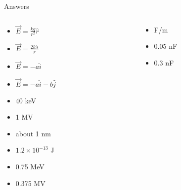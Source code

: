 \documentclass{beamer}
\begin{document}
\begin{frame}{Answers}
\small
\begin{columns}[T]
\begin{column}{0.5\textwidth}
\begin{itemize}
\item $\vec{E} = \frac{kq}{r^2}\hat{r}$
\item $\vec{E} = \frac{2k\lambda}{r}$
\item $\vec{E} = -a\hat{i}$
\item $\vec{E} = -a\hat{i}-b\hat{j}$
\item 40 keV
\item 1 MV
\item about 1 nm
\item $1.2 \times 10^{-13}$ J
\item 0.75 MeV
\item 0.375 MV
\end{itemize}
\end{column}
\begin{column}{0.5\textwidth}
\begin{itemize}
\item F/m
\item 0.05 nF
\item 0.3 nF
\end{itemize}
\end{column}
\end{columns}
\end{frame}
\end{document}
